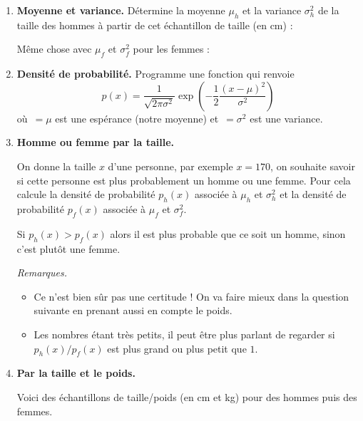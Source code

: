 \documentclass[11pt,class=report,crop=false]{standalone}
\begin{document}
\begin{activite}
	

\begin{enumerate}
	\item \textbf{Moyenne et variance.}
	Détermine la moyenne $\mu_h$ et la variance $\sigma^2_h$ de la taille des hommes à partir de cet échantillon de taille (en cm) :	
	
	Même chose avec $\mu_f$ et $\sigma^2_f$ pour les femmes :	
	
	\item \textbf{Densité de probabilité.}
	Programme une fonction  qui renvoie
	$$p(x) = \frac{1}{\sqrt{2\pi\sigma^2}} \exp\left( -\frac12 \frac{(x-\mu)^2}{\sigma^2} \right)$$
	où \,$=\mu$ est une espérance (notre moyenne) et \,$=\sigma^2$ est une variance.
	

	\item \textbf{Homme ou femme par la taille.}
	
	On donne la taille $x$ d'une personne, par exemple $x=170$, on souhaite savoir si cette personne est plus probablement un homme ou une femme. 
	Pour cela calcule la densité de probabilité $p_h(x)$ associée à $\mu_h$ et $\sigma^2_h$ et la densité de probabilité $p_f(x)$ associée à $\mu_f$ et $\sigma^2_f$.
	
	Si $p_h(x)>p_f(x)$ alors il est plus probable que ce soit un homme, sinon c'est plutôt une femme. 
	
	\emph{Remarques.}
	\begin{itemize}
		\item Ce n'est bien sûr pas une certitude ! On va faire mieux dans la question suivante en prenant aussi en compte le poids.
		\item Les nombres étant très petits, il peut être plus parlant de regarder si
		$p_h(x)/p_f(x)$ est plus grand ou plus petit que $1$.
	\end{itemize}


	\item \textbf{Par la taille et le poids.}
	
	Voici des échantillons de taille/poids (en cm et kg) pour des hommes puis des femmes.
	

\end{enumerate}
\end{activite}
\end{document}
